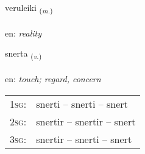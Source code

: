 \documentclass[frontgrid, backgrid]{flacards}\usepackage[]{graphicx}\usepackage[]{color}
\begin{document}
\renewcommand{\blhead}{\vskip5pt {\small\bfseries\footnotesize Nafnorð | Noun }}
\renewcommand{\bcfoot}{\vskip5pt \hspace{2pt}{\small\bfseries\footnotesize 2K}}


{veruleiki \small{\textsubscript{(\textit{m.})}} \\[1ex] %
\textphonetic{[vɛːrʏleicɪ]} \\
en: \emph{reality} \\  [2ex]
\renewcommand*{\arraystretch}{0.8}
}

\renewcommand{\flhead}{\vskip5pt \fboxsep=0pt {\small\bfseries\footnotesize Sagnorð | Verb}}
\renewcommand{\fcfoot}{\vskip5pt \fboxsep=0pt \hspace{2pt}{\small\bfseries\footnotesize 2K}}

\renewcommand{\blhead}{\vskip5pt {\small\bfseries\footnotesize Sagnorð | Verb }}
\renewcommand{\bcfoot}{\vskip5pt \hspace{2pt}{\small\bfseries\footnotesize 2K}}


{snerta \small{\textsubscript{(\textit{v.})}} \\[1ex] %
\textphonetic{[stnɛr̥ta]} \\
en: \emph{touch; regard, concern} \\  [2ex]
\renewcommand*{\arraystretch}{0.8}
\begin{tabular}{p{1cm}l}
\textsc{1sg}: & snerti -- snerti -- snert \\ 
\textsc{2sg}: & snertir -- snertir -- snert \\ 
\textsc{3sg}: & snertir -- snerti -- snert \\ 
\end{tabular}
}
\end{document}
